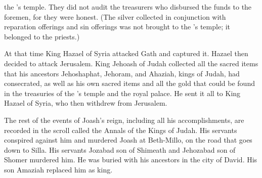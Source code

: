 {the
{}’s
temple.
They did not
audit
the treasurers who disbursed
the funds
to the foremen,
for
they were
honest.
(The silver
collected in conjunction with reparation
offerings and sin offerings was not
brought
to the
{}’s
temple;
it belonged to the priests.)
\par }{\PP {}At that time
King
Hazael
of Syria
attacked
Gath
and captured
it.
Hazael
then decided to attack
Jerusalem.
King
Jehoash
of Judah
collected
all
the sacred
items
that
his ancestors
Jehoshaphat,
Jehoram,
and Ahaziah,
kings
of Judah,
had
consecrated,
as well as
his own sacred items
and all
the gold
that could be found
in the treasuries
of the
{}’s
temple
and the royal
palace.
He sent
it all to King
Hazael
of Syria,
who then withdrew from
Jerusalem.
\par }{\PP {}The rest
of the events
of Joash’s
reign, including all
his accomplishments,
are recorded
in the scroll
called the Annals
of the Kings
of Judah.
His servants
conspired against
him and murdered
Joash
at Beth-Millo,
on the road that goes down
to Silla.
His servants
Jozabad
son
of Shimeath
and Jehozabad
son
of Shomer
murdered him.
He was buried
with
his ancestors
in the city
of David.
His son
Amaziah
replaced him as king.

}
